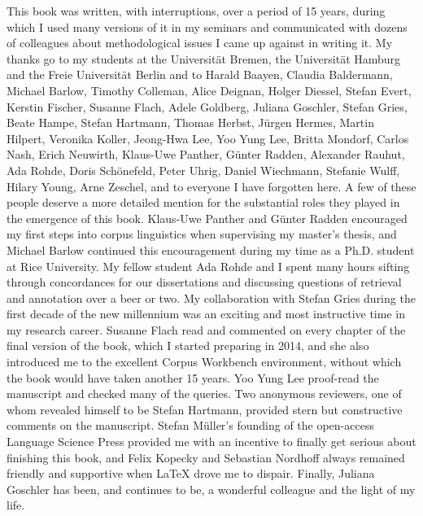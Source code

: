 \addchap{\lsAcknowledgementTitle} 

This book was written, with interruptions, over a period of 15 years, during which I used many versions of it in my seminars and communicated with dozens of colleagues about methodological issues I came up against in writing it. My thanks go to my students at the
Universität Bremen, the Universität Hamburg and the Freie Universität Berlin and to Harald Baayen, Claudia Baldermann, Michael Barlow, Timothy Colleman, Alice Deignan, Holger Diessel, Stefan Evert, Kerstin Fischer, Susanne Flach, Adele Goldberg, Juliana Goschler, Stefan Gries, Beate Hampe, Stefan Hartmann, Thomas Herbst, Jürgen Hermes, Martin Hilpert, Veronika Koller, Jeong-Hwa Lee, Yoo Yung Lee, Britta Mondorf, Carlos Nash, Erich Neuwirth, Klaus-Uwe Panther, Günter Radden, Alexander Rauhut, Ada Rohde, Doris Schönefeld, Peter Uhrig, Daniel Wiechmann, Stefanie Wulff, Hilary Young, Arne Zeschel, and to everyone I have forgotten here. A few of these people deserve a more detailed mention for the substantial roles they played in the emergence of this book. Klaus-Uwe Panther and Günter Radden encouraged my first steps into corpus linguistics when supervising my master's thesis, and Michael Barlow continued this encouragement during my time as a Ph.D. student at Rice University. My fellow student Ada Rohde and I spent many hours sifting through concordances for our dissertations and discussing questions of retrieval and annotation over a beer or two. My collaboration with Stefan Gries during the first decade of the new millennium was an exciting and most instructive time in my research career. Susanne Flach read and commented on every chapter of the final version of the book, which I started preparing in 2014, and she also introduced me to the excellent Corpus Workbench environment, without which the book would have taken another 15 years. Yoo Yung Lee proof-read the manuscript and checked many of the queries. Two anonymous reviewers, one of whom revealed himself to be Stefan Hartmann, provided stern but constructive comments on the manuscript. Stefan Müller's founding of the open-access Language Science Press provided me with an incentive to finally get serious about finishing this book, and Felix Kopecky and Sebastian Nordhoff always remained friendly and supportive when {\LaTeX} drove me to dispair. Finally, Juliana Goschler has been, and continues to be, a wonderful colleague and the light of my life.
